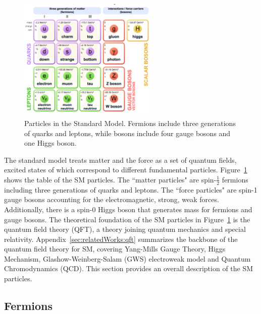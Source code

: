 \begin{figure}[ht]
    \centering
    \includegraphics[width=0.6\textwidth]{chapters/RelatedWorks/sectionSMParticles/figures/sm.png}
    \caption{Particles in the Standard Model. Fermions include three generations of quarks and leptons, while bosons include four gauge bosons and one Higgs boson.}
    \label{fig:relatedWorks:smParticles:sm}
\end{figure}

The standard model treats matter and the force as a set of quantum fields, excited states of which correspond to different fundamental particles. Figure~\ref{fig:relatedWorks:smParticles:sm} shows the table of the SM particles. The ``matter particles" are spin-$\frac{1}{2}$ fermions including three generations of quarks and leptons. The ``force particles" are spin-1 gauge bosons accounting for the electromagnetic, strong, weak forces. Additionally, there is a spin-0 Higgs boson that generates mass for fermions and gauge bosons. The theoretical foundation of the SM particles in Figure~\ref{fig:relatedWorks:smParticles:sm} is the quantum field theory (QFT), a theory joining quantum mechanics and special relativity.  Appendix~\ref{sec:relatedWorks:qft} summarizes the backbone of the quantum field theory for SM, covering Yang-Mills Gauge Theory, Higgs Mechanism, Glashow-Weinberg-Salam (GWS) electroweak model and Quantum Chromodynamics (QCD). This section provides an overall description of the SM particles. 


\subsection{Fermions}
\label{sec:relatedWorks:smParticles:fermion}

